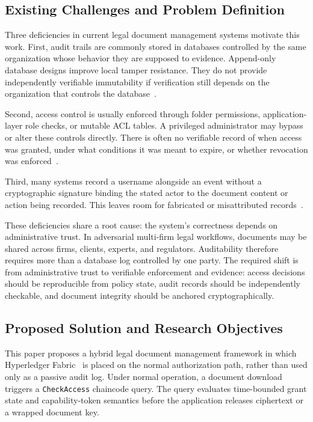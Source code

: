 \documentclass{ieeeaccess}
\begin{document}
\subsection{Existing Challenges and Problem Definition}
\label{sec:challenges}

Three deficiencies in current legal document management systems motivate this
work. First, audit trails are commonly stored in databases controlled by the
same organization whose behavior they are supposed to evidence. Append-only
database designs improve local tamper resistance. They do not provide
independently verifiable immutability if verification still depends on the
organization that controls the database~\cite{nistir8202}.

Second, access control is usually enforced through folder permissions,
application-layer role checks, or mutable ACL tables. A privileged
administrator may bypass or alter these controls directly. There is often no
verifiable record of when access was granted, under what conditions it was
meant to expire, or whether revocation was enforced~\cite{chainOfCustodySLR2023,cai2023timebound}.

Third, many systems record a username alongside an event without a
cryptographic signature binding the stated actor to the document content or
action being recorded. This leaves room for fabricated or misattributed
records~\cite{arora2019blockchain}.

These deficiencies share a root cause: the system's correctness depends on
administrative trust. In adversarial multi-firm legal workflows, documents may
be shared across firms, clients, experts, and regulators. Auditability
therefore requires more than a database log controlled by one party. The
required shift is from administrative trust to verifiable enforcement and
evidence: access decisions should be reproducible from policy state, audit
records should be independently checkable, and document integrity should be
anchored cryptographically.

\subsection{Proposed Solution and Research Objectives}
\label{sec:solution}

This paper proposes a hybrid legal document management framework in which
Hyperledger Fabric~\cite{androulaki2018hyperledger} is placed on the normal
authorization path, rather than used only as a passive audit log. Under normal
operation, a document download triggers a \texttt{CheckAccess} chaincode query.
The query evaluates time-bounded grant state and capability-token semantics
before the application releases ciphertext or a wrapped document key.
\end{document}
